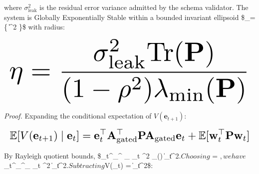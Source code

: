 \documentclass[10pt,twocolumn,letterpaper]{article}
\begin{document}
where $\sigma_{\text{leak}}^2$ is the residual error variance admitted by the schema validator. The system is Globally Exponentially Stable within a bounded invariant ellipsoid \$\_\eta = \{ \mid \|\|^2 \le \eta\}\$ with radius:










\begin{equation}
\resizebox{\columnwidth}{!}{$\displaystyle
\begin{aligned}
\eta = \frac{\sigma_{\text{leak}}^2 \text{Tr}(\mathbf{P})}{(1 - \rho^2) \lambda_{\min}(\mathbf{P})}
\end{aligned}
$}
\end{equation}










\textit{Proof.} Expanding the conditional expectation of $V(\mathbf{e}_{t+1})$:










\begin{equation}
\resizebox{\columnwidth}{!}{$\displaystyle
\begin{aligned}
\mathbb{E}[V(\mathbf{e}_{t+1}) \mid \mathbf{e}_t] = \mathbf{e}_t^\top \mathbf{A}_{\text{gated}}^\top \mathbf{P} \mathbf{A}_{\text{gated}} \mathbf{e}_t + \mathbb{E}[\mathbf{w}_t^\top \mathbf{P} \mathbf{w}_t]
\end{aligned}
$}
\end{equation}










By Rayleigh quotient bounds, \$\_t^\top {}\_{}^\top {} \_{} \_t \le \rho^2 \lambda\_{\max}() \|\_t\|^2$. Choosing $ = $, we have $\_t^\top {}\_{}^\top {}\_{} \_t \le \rho^2 \|\_t\|^2$. Subtracting $V(\_t) = \|\_t\|^2\$:
\end{document}
